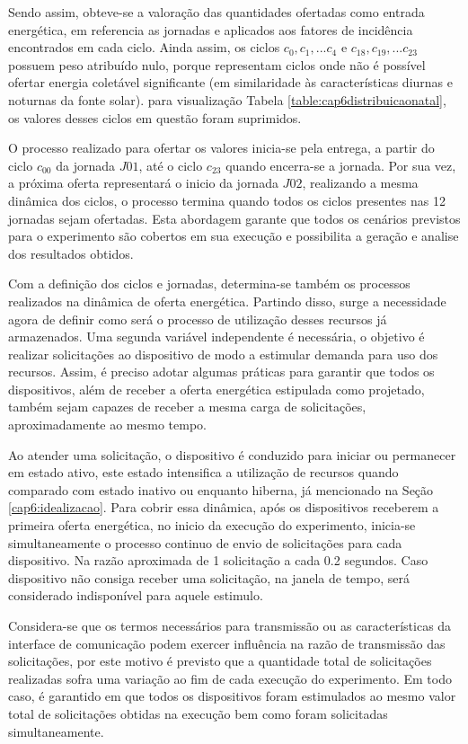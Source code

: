 Sendo assim, obteve-se a valoração das quantidades ofertadas como entrada energética, em referencia as jornadas e aplicados aos fatores de incidência encontrados em cada ciclo. Ainda assim, os ciclos $c_0, c_1,... c_4$ e $c_{18}, c_{19},... c_{23}$ possuem peso atribuído nulo, porque representam ciclos onde não é possível ofertar energia coletável significante (em similaridade às características diurnas e noturnas da fonte solar). para visualização Tabela \ref{table:cap6distribuicaonatal}, os valores desses ciclos em questão foram suprimidos.

O processo realizado para ofertar os valores inicia-se pela entrega, a partir do ciclo $c_{00}$ da jornada $J01$, até o ciclo $c_{23}$ quando encerra-se a jornada. Por sua vez, a próxima oferta representará o inicio da jornada $J02$, realizando a mesma dinâmica dos ciclos, o processo termina quando todos os ciclos presentes nas 12 jornadas sejam ofertadas. Esta abordagem garante que todos os cenários previstos para o experimento são cobertos em sua execução e possibilita a geração e analise dos resultados obtidos.

Com a definição dos ciclos e jornadas, determina-se também os processos realizados na dinâmica de oferta energética. Partindo disso, surge a necessidade agora de definir como será o processo de utilização desses recursos já armazenados. Uma segunda variável independente é necessária, o objetivo é realizar solicitações ao dispositivo de modo a estimular demanda para uso dos recursos. Assim, é preciso adotar algumas práticas para garantir que todos os dispositivos, além de receber a oferta energética estipulada como projetado, também sejam capazes de receber a mesma carga de solicitações, aproximadamente ao mesmo tempo. 

Ao atender uma solicitação, o dispositivo é conduzido para iniciar ou permanecer em estado ativo, este estado intensifica a utilização de recursos quando comparado com estado inativo ou enquanto hiberna, já mencionado na Seção \ref{cap6:idealizacao}. Para cobrir essa dinâmica, após os dispositivos receberem a primeira oferta energética, no inicio da execução do experimento, inicia-se simultaneamente o processo continuo de envio de solicitações para cada dispositivo. Na razão aproximada de 1 solicitação a cada 0.2 segundos. Caso dispositivo não consiga receber uma solicitação, na janela de tempo, será considerado indisponível para aquele estimulo. 

Considera-se que os termos necessários para transmissão ou as características da interface de comunicação podem exercer influência na razão de transmissão das solicitações, por este motivo é previsto que a quantidade total de solicitações realizadas sofra uma variação ao fim de cada execução do experimento. Em todo caso, é garantido em que todos os dispositivos foram estimulados ao mesmo valor total de solicitações obtidas na execução bem como foram solicitadas simultaneamente.

